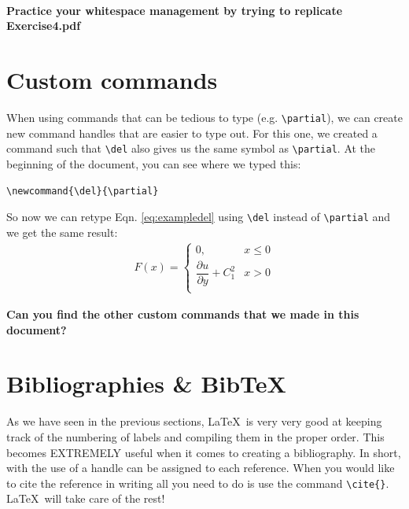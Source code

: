 \documentclass[]{article}%
\newcommand{\del}{\partial}
\newcommand{\bs}{\textbackslash}
\newcommand{\TT}[1]{\texttt{#1}}
\newcommand{\tpc}{\textperiodcentered}
\theoremstyle{definition}
\begin{document}
	\paragraph{Practice your whitespace management by trying to replicate Exercise4.pdf}
	\clearpage
	
	\section{Custom commands}
	\label{sec:customcommands}
	When using commands that can be tedious to type (e.g. \TT{\bs partial}), we can create new command handles that are easier to type out.
	For this one, we created a command such that \TT{\bs del} also gives us the same symbol as \TT{\bs partial}.
	At the beginning of the document, you can see where we typed this:
	\begin{center}
		\TT{\bs newcommand\{\bs del\}\{\bs partial\}} \\
	\end{center}
	So now we can retype Eqn. \eqref{eq:exampledel} using \TT{\bs del} instead of \TT{\bs partial} and we get the same result:
	\begin{align*}
		F(x) = \left\{ 
		\begin{array}{ll}
			0, & x \leq 0 \\
			\dfrac{\del u}{\del y} + C_1^2  & x > 0\\
		\end{array}
		\right. 
	\end{align*}
	\vspace{1cm}
	
	\begin{center}
		\textbf{Can you find the other custom commands that we made in this document?}
	\end{center}
	
	\clearpage
	\section{Bibliographies \& BibTeX}
	\label{sec:bibliography}
	As we have seen in the previous sections, \LaTeX\ is very very good at keeping track of the numbering of labels and compiling them in the proper order.
	This becomes EXTREMELY useful when it comes to creating a bibliography.
	In short, with the use of  a handle can be assigned to each reference.
	When you would like to cite the reference in writing all you need to do is use the command \TT{\bs cite\{\tpc\}}.
	\LaTeX\ will take care of the rest!
	
\end{document}
